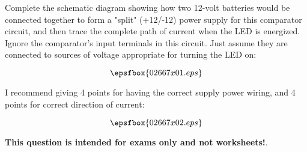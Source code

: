 

Complete the schematic diagram showing how two 12-volt batteries would be connected together to form a "split" (+12/-12) power supply for this comparator circuit, and then trace the complete path of current when the LED is energized.  Ignore the comparator's input terminals in this circuit.  Just assume they are connected to sources of voltage appropriate for turning the LED on:

\vskip 30pt

$$\epsfbox{02667x01.eps}$$







I recommend giving 4 points for having the correct supply power wiring, and 4 points for correct direction of current:

$$\epsfbox{02667x02.eps}$$







{\bf This question is intended for exams only and not worksheets!}.




